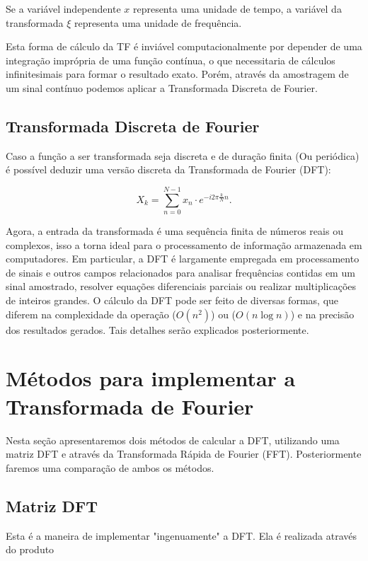 \documentclass[brazil,times]{abnt}
\begin{document}
		Se a variável independente $x$ representa uma unidade de tempo, a variável da transformada $\xi$ representa uma unidade de frequência. 
		
		Esta forma de cálculo da TF é inviável computacionalmente por depender de uma integração imprópria de uma função contínua, o que necessitaria de cálculos infinitesimais para formar o resultado exato. Porém, através da amostragem de um sinal contínuo podemos aplicar a Transformada Discreta de Fourier.

	\subsection*{Transformada Discreta de Fourier}
		Caso a função a ser transformada seja discreta e de duração finita (Ou periódica) é possível deduzir uma versão discreta da Transformada de Fourier (DFT):

		$$X_k = \sum_{n=0}^{N-1} x_n \cdot e^{-i 2 \pi \frac{k}{N} n}.$$

		Agora, a entrada da transformada é uma sequência finita de números reais ou complexos, isso a torna ideal para o processamento de informação armazenada em computadores. Em particular, a DFT é largamente empregada em processamento de sinais e outros campos relacionados para analisar frequências contidas em um sinal amostrado, resolver equações diferenciais parciais ou realizar multiplicações de inteiros grandes. O cálculo da DFT pode ser feito de diversas formas, que diferem na complexidade da operação ($O(n^2)$) ou ($O(n \log{n})$) e na precisão dos resultados gerados. Tais detalhes serão explicados posteriormente.



\section*{Métodos para implementar a Transformada de Fourier}
	Nesta seção apresentaremos dois métodos de calcular a DFT, utilizando uma matriz DFT e através da Transformada Rápida de Fourier (FFT). Posteriormente faremos uma comparação de ambos os métodos.
	
	\subsection*{Matriz DFT}
		Esta é a maneira de implementar "ingenuamente" a DFT. Ela é realizada através do produto
\end{document}

